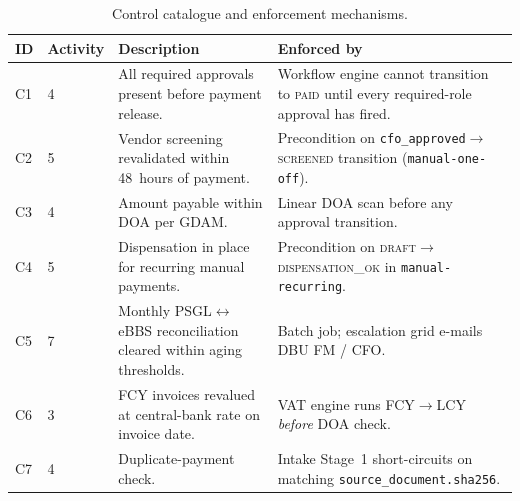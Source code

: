 \documentclass[11pt,a4paper,twoside]{report}
\begin{document}
\begin{table}[htbp]
\centering
\caption{Control catalogue and enforcement mechanisms.}
\label{tab:controls}
\small
\begin{tabularx}{\linewidth}{@{}l l X X@{}}
\toprule
\textbf{ID} & \textbf{Activity} & \textbf{Description} & \textbf{Enforced by} \\ \midrule
C1 & 4 & All required approvals present before payment release. & Workflow engine cannot transition to \textsc{paid} until every required-role approval has fired. \\
C2 & 5 & Vendor screening revalidated within 48~hours of payment. & Precondition on \texttt{cfo\_approved}$\to$\textsc{screened} transition (\texttt{manual-one-off}). \\
C3 & 4 & Amount payable within DOA per GDAM. & Linear DOA scan before any approval transition. \\
C4 & 5 & Dispensation in place for recurring manual payments. & Precondition on \textsc{draft}$\to$\textsc{dispensation\_ok} in \texttt{manual-recurring}. \\
C5 & 7 & Monthly PSGL$\leftrightarrow$eBBS reconciliation cleared within aging thresholds. & Batch job; escalation grid e-mails DBU FM / CFO. \\
C6 & 3 & FCY invoices revalued at central-bank rate on invoice date. & VAT engine runs FCY$\to$LCY \emph{before} DOA check. \\
C7 & 4 & Duplicate-payment check. & Intake Stage~1 short-circuits on matching \texttt{source\_document.sha256}. \\
\bottomrule
\end{tabularx}
\end{table}
\end{document}
